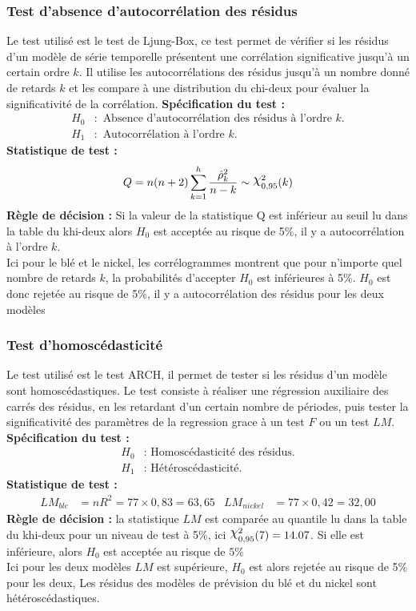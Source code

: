 \subsubsection*{Test d'absence d'autocorrélation des résidus}
Le test utilisé est le test de Ljung-Box, ce test permet de vérifier si les résidus d'un modèle de série temporelle présentent une corrélation significative jusqu'à un 
certain ordre $k$. Il utilise les autocorrélations des résidus jusqu'à un nombre donné de retards $k$ et les compare à une distribution du chi-deux pour évaluer la 
significativité de la corrélation. \textbf{Spécification du test :} 
    \begin{align*}
        H_{0} &: \text{ Absence d'autocorrélation des résidus à l'ordre $k$.} \\
        H_{1} &: \text{ Autocorrélation à l'ordre $k$.}
    \end{align*}
\textbf{Statistique de test :} 
\begin{equation*}
        Q = n(n+2)\sum_{k=1}^h\frac{\hat{\rho}^2_k}{n-k} \sim \rchi^{2}_{0,95}(k)
\end{equation*}
\textbf{Règle de décision :} Si la valeur de la statistique Q est inférieur au seuil lu dans la table du khi-deux alors $H_{0}$ est acceptée au risque de 5\%, il y a autocorrélation à l'ordre $k$.\\
Ici pour le blé et le nickel, les corrélogrammes montrent que pour n'importe quel nombre de retards $k$, la probabilités d'accepter $H_{0}$ est inférieures à 5\%. $H_{0}$ est donc rejetée au risque de 5\%,  il y a autocorrélation des résidus pour les deux modèles\\
\subsubsection*{Test d'homoscédasticité}
Le test utilisé est le test ARCH, il permet de tester si les résidus d'un modèle sont homoscédastiques. Le test consiste à réaliser une régression auxiliaire des carrés des résidus, en les retardant d'un certain nombre de périodes, puis tester la significativité des paramètres de la regression grace à un test $F$ ou un test $LM$.\\
\textbf{Spécification du test :} 
    \begin{align*}
        H_{0} &: \text{ Homoscédasticité des résidus.} \\
        H_{1} &: \text{ Hétéroscédasticité.}
    \end{align*}
\textbf{Statistique de test :} 
    \begin{align*}
        LM_{ble} &= nR^{2} = 77 \times 0,83 =63,65        & LM_{nickel} &= 77 \times 0,42 =32,00
    \end{align*}
\textbf{Règle de décision :} la statistique $LM$ est comparée au quantile lu dans la table du khi-deux pour un niveau de test à 5\%, ici $\rchi^{2}_{0,95}(7) = 14.07$. Si elle est inférieure, alors $H_{0}$ est acceptée au risque de $5\%$ \\ 
Ici pour les deux modèles $LM$ est supérieure, $H_{0}$ est alors rejetée au risque de 5\% pour les deux, Les résidus des modèles de prévision du blé et du nickel sont hétéroscédastiques.
